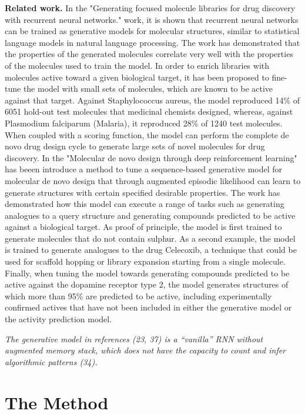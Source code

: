 \documentclass[a4paper]{article}
\newcommand{\mypar}[1]{{\bf #1.}}
\begin{document}
\mypar{Related work} 
In the "Generating focused molecule libraries for drug discovery with recurrent neural networks." \cite{generating-focused-molecule} work, it is shown that recurrent neural networks can be trained as generative models for molecular structures, similar to statistical language models in natural language processing. The work has demonstrated that the properties of the generated molecules correlate very well with the properties of the molecules used to train the model. In order to enrich libraries with molecules active toward a given biological target, it has been proposed to fine-tune the model with small sets of molecules, which are known to be active against that target. Against Staphylococcus aureus, the model reproduced 14\% of 6051 hold-out test molecules that medicinal chemists designed, whereas, against Plasmodium falciparum (Malaria), it reproduced 28\% of 1240 test molecules. When coupled with a scoring function, the model can perform the complete de novo drug design cycle to generate large sets of novel molecules for drug discovery. 
In the "Molecular de novo design through deep reinforcement learning" \cite{molecular-denovo-design} has beeen introduce a method to tune a sequence-based generative model for molecular de novo design that through augmented episodic likelihood can learn to generate structures with certain specified desirable properties. The work has demonstrated how this model can execute a range of tasks such as generating analogues to a query structure and generating compounds predicted to be active against a biological target. As proof of principle, the model is first trained to generate molecules that do not contain sulphur. As a second example, the model is trained to generate analogues to the drug Celecoxib, a technique that could be used for scaffold hopping or library expansion starting from a single molecule. Finally, when tuning the model towards generating compounds predicted to be active against the dopamine receptor type 2, the model generates structures of which more than 95\% are predicted to be active, including experimentally confirmed actives that have not been included in either the generative model or the activity prediction model.

\textit{The generative
model in references (23, 37) is a “vanilla” RNN without augmented
memory stack, which does not have the capacity to count and infer
algorithmic patterns (34).
}

\section{The Method}\label{sec:The Method}
\end{document}
